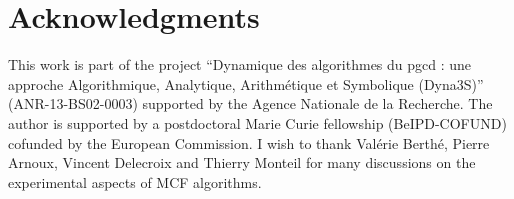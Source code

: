 \section*{Acknowledgments}

This work is part of the project ``Dynamique des algorithmes du pgcd : une
approche Algorithmique, Analytique, Arithmétique et Symbolique (Dyna3S)''
(ANR-13-BS02-0003)  supported by the Agence Nationale de la Recherche. The
author is supported by a postdoctoral Marie Curie fellowship (BeIPD-COFUND)
cofunded by the European Commission. I wish to thank Valérie Berthé, Pierre
Arnoux, Vincent Delecroix and Thierry Monteil for many discussions on the
experimental aspects of MCF algorithms.

